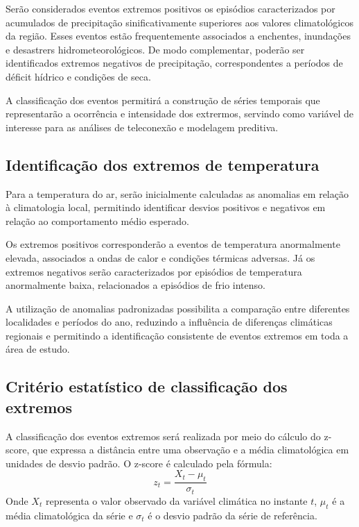 	Serão considerados eventos extremos positivos os episódios caracterizados por acumulados de precipitação sinificativamente superiores  aos valores climatológicos da região.
	Esses eventos estão frequentemente associados a enchentes, inundações e desastrers hidrometeorológicos.
	De modo complementar, poderão ser identificados extremos negativos de precipitação, correspondentes a períodos de déficit hídrico e condições de seca.

	A classificação dos eventos permitirá a construção de séries temporais que representarão a ocorrência e intensidade dos extrermos, servindo como variável de interesse para as análises de teleconexão e modelagem preditiva.

\subsection{Identificação dos extremos de temperatura}\label{sec:identificacao-extremos-temperatura}

	Para a temperatura do ar, serão inicialmente calculadas as anomalias em relação à climatologia local, permitindo identificar desvios positivos e negativos em relação ao comportamento médio esperado.

	Os extremos positivos corresponderão a eventos de temperatura anormalmente elevada, associados a ondas de calor e condições térmicas adversas.
	Já os extremos negativos serão caracterizados por episódios de temperatura anormalmente baixa, relacionados a episódios de frio intenso.

	A utilização de anomalias padronizadas possibilita a comparação entre diferentes localidades e períodos do ano, reduzindo a influência de diferenças climáticas regionais e permitindo a identificação consistente de eventos extremos em toda a área de estudo.

\subsection{Critério estatístico de classificação dos extremos}

	A classificação dos eventos extremos será realizada por meio do cálculo do z-score, que expressa a distância entre uma observação e a média climatológica em unidades de desvio padrão.
	O z-score é calculado pela fórmula:
	\begin{equation}
		z_t = \frac{X_t - \mu_t}{\sigma_t}
	\end{equation}
	Onde $X_t$ representa o valor observado da variável climática no instante $t$, $\mu_t$ é a média climatológica da série e $\sigma_t$ é o desvio padrão da série de referência.

